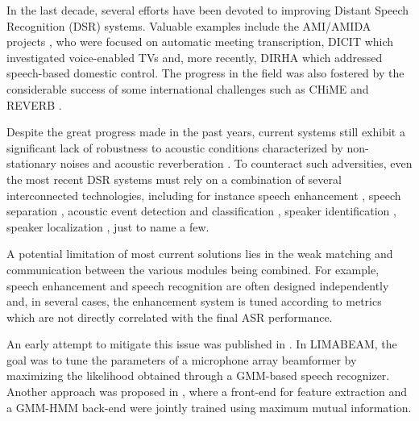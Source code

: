 \documentclass{article}
\begin{document}
In the last decade, several efforts have been devoted to improving Distant Speech Recognition (DSR) systems. Valuable examples include the AMI/AMIDA projects \cite{ami}, who were focused on automatic meeting transcription, DICIT \cite{dicit_1} which investigated voice-enabled TVs and, more recently, DIRHA which addressed speech-based domestic control. %
The progress in the field was also fostered by the considerable success of some international challenges such as CHiME \cite{chime,chime3} and REVERB \cite{revch_full}.%

Despite the great progress made in the past years, current systems still exhibit a significant lack of robustness to acoustic conditions characterized by non-stationary noises and acoustic reverberation \cite{adverse}. 
To counteract such adversities, even the most recent DSR systems \cite{nakatani} %
must rely on a combination of several interconnected technologies, including for instance speech enhancement \cite{BrandWard}, speech separation \cite{bss}, acoustic event detection and classification \cite{aed1,eusipco}, speaker identification \cite{Beigi}, speaker localization \cite{gcf,hscma}, just to name a few.

A potential limitation of most current solutions lies in the weak matching and communication between the various modules being combined.
For example, speech enhancement and speech recognition are often designed independently and, in several cases, the enhancement system is tuned according to metrics which are not directly correlated with the final ASR performance. %

An early attempt to mitigate this issue was published in \cite{limabeam}. In LIMABEAM, the goal was to tune the parameters of a microphone array beamformer by maximizing  the likelihood  %
obtained through a GMM-based speech recognizer. Another approach was proposed in \cite{droppo}, where a front-end for feature extraction and a GMM-HMM back-end were jointly trained using maximum mutual information. 
\end{document}
